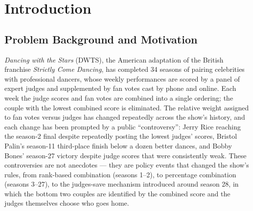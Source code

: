 \documentclass[11pt]{article}
\begin{document}
\begin{abstract}
talent/popularity variation, with no trait reaching 95\% credibility in the judge
equation, and that merit protection versus upset drama trades off steeply and
monotonically with the judge weight (fairness $\approx 0.999$ at $\omega = 1$ versus a
95.7\% upset rate at $\omega = 0$), with no interior optimum. We recommend: retain the
50/50 percentage-based combination, keep and formalize the judges-save, publish
fan-vote uncertainty bands rather than totals, and reject the suspense bonus, which our
simulator could not validate. All headline numbers are traced to released artifacts;
where internal review identified unresolved implementation issues (Models 2--3), the
affected results are explicitly labeled provisional rather than validated.
\end{abstract}

\tableofcontents
\newpage

\section{Introduction}

\subsection{Problem Background and Motivation}

\textit{Dancing with the Stars} (DWTS), the American adaptation of the British franchise
\textit{Strictly Come Dancing}, has completed 34 seasons of pairing celebrities with
professional dancers, whose weekly performances are scored by a panel of expert judges
and supplemented by fan votes cast by phone and online. Each week the judge scores and
fan votes are combined into a single ordering; the couple with the lowest combined score
is eliminated. The relative weight assigned to fan votes versus judges has changed
repeatedly across the show's history, and each change has been prompted by a public
``controversy'': Jerry Rice reaching the season-2 final despite repeatedly posting the
lowest judges' scores, Bristol Palin's season-11 third-place finish below a dozen better
dances, and Bobby Bones' season-27 victory despite judge scores that were consistently
weak. These controversies are not anecdotes --- they are policy events that changed the
show's rules, from rank-based combination (seasons 1--2), to percentage combination
(seasons 3--27), to the judges-save mechanism introduced around season 28, in which the
bottom two couples are identified by the combined score and the judges themselves choose
who goes home.
\end{document}
